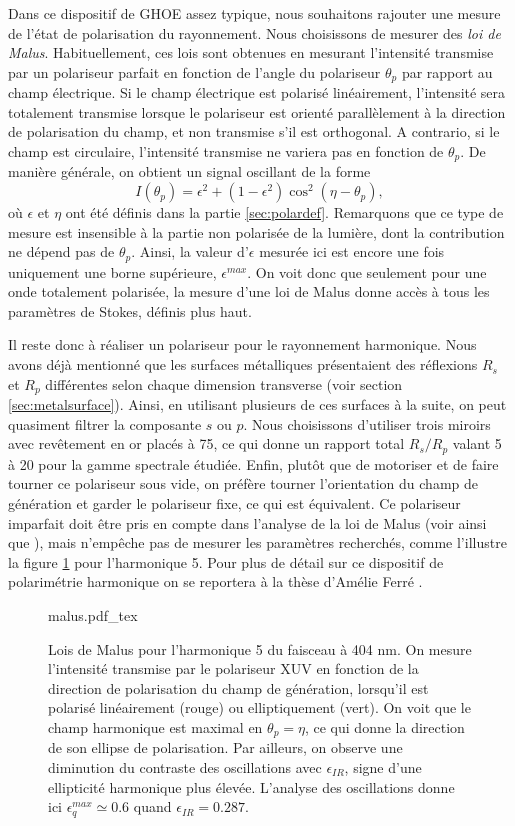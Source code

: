 Dans ce dispositif de GHOE assez typique, nous souhaitons rajouter une mesure de l'état de polarisation du rayonnement. Nous choisissons de mesurer des \textit{loi de Malus}. Habituellement, ces lois sont obtenues en mesurant l'intensité transmise par un polariseur parfait en fonction de l'angle du polariseur $\theta_p$ par rapport au champ électrique. Si le champ électrique est polarisé linéairement, l'intensité sera totalement transmise lorsque le polariseur est orienté parallèlement à la direction de polarisation du champ, et non transmise s'il est orthogonal. A contrario, si le champ est circulaire, l'intensité transmise ne variera pas en fonction de $\theta_p$. De manière générale, on obtient un signal oscillant de la forme 
\[I(\theta_p) = \epsilon^2+(1-\epsilon^2)\cos^2(\eta-\theta_p),\]
où $\epsilon$ et $\eta$ ont été définis dans la partie \ref{sec:polardef}. Remarquons que ce type de mesure est insensible à la partie non polarisée de la lumière, dont la contribution ne dépend pas de $\theta_p$. Ainsi, la valeur d'$\epsilon$ mesurée ici est encore une fois uniquement une borne supérieure, $\epsilon^{max}$. On voit donc que seulement pour une onde totalement polarisée, la mesure d'une loi de Malus donne accès à tous les paramètres de Stokes, définis plus haut. 

Il reste donc à réaliser un polariseur pour le rayonnement harmonique. Nous avons déjà mentionné que les surfaces métalliques présentaient des réflexions $R_s$ et $R_p$ différentes selon chaque dimension transverse (voir section \ref{sec:metalsurface}). Ainsi, en utilisant plusieurs de ces surfaces à la suite, on peut quasiment filtrer la composante $s$ ou $p$. Nous choisissons d'utiliser trois miroirs avec revêtement en or placés à 75\degres, ce qui donne un rapport total $R_s/R_p$ valant 5 à 20 pour la gamme spectrale étudiée. Enfin, plutôt que de motoriser et de faire tourner ce polariseur sous vide, on préfère tourner l'orientation du champ de génération et garder le polariseur fixe, ce qui est équivalent. Ce polariseur imparfait doit être pris en compte dans l'analyse de la loi de Malus (voir  ainsi que ), mais n'empêche pas de mesurer les paramètres recherchés, comme l'illustre la figure \ref{fig:malus} pour l'harmonique 5. Pour plus de détail sur ce dispositif de polarimétrie harmonique on se reportera à la thèse d'Amélie Ferré .

\begin{figure}[!ht]
\centering
\def\svgwidth{0.7\columnwidth}
{malus.pdf_tex}
\caption{Lois de Malus pour l'harmonique 5 du faisceau à 404 nm. On mesure l'intensité transmise par le polariseur XUV en fonction de la direction de polarisation du champ de génération, lorsqu'il est polarisé linéairement (rouge) ou elliptiquement (vert). On voit que le champ harmonique est maximal en $\theta_p = \eta$, ce qui donne la direction de son ellipse de polarisation. Par ailleurs, on observe une diminution du contraste des oscillations avec $\epsilon_{IR}$, signe d'une ellipticité harmonique plus élevée. L'analyse des oscillations donne ici $\epsilon_q^{max} \simeq 0.6$ quand $\epsilon_{IR}=0.287$.}
\label{fig:malus}
\end{figure}

